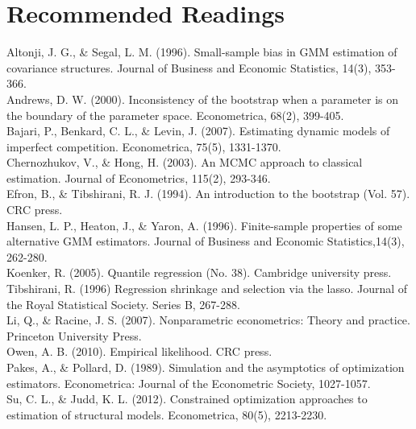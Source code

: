 \documentclass[11pt]{article}
\begin{document}
\section{Recommended Readings}
Altonji, J. G., \& Segal, L. M. (1996). Small-sample bias in GMM estimation of covariance structures. Journal of Business and Economic Statistics, 14(3), 353-366. \\
Andrews, D. W. (2000). Inconsistency of the bootstrap when a parameter is on the boundary of the parameter space. Econometrica, 68(2), 399-405. \\
Bajari, P., Benkard, C. L., \& Levin, J. (2007). Estimating dynamic models of imperfect competition. Econometrica, 75(5), 1331-1370. \\
Chernozhukov, V., \& Hong, H. (2003). An MCMC approach to classical estimation. Journal of Econometrics, 115(2), 293-346. \\
Efron, B., \& Tibshirani, R. J. (1994). An introduction to the bootstrap (Vol. 57). CRC press. \\
Hansen, L. P., Heaton, J., \& Yaron, A. (1996). Finite-sample properties of some alternative GMM estimators. Journal of Business and Economic Statistics,14(3), 262-280. \\
Koenker, R. (2005). Quantile regression (No. 38). Cambridge university press. \\
Tibshirani, R. (1996) Regression shrinkage and selection via the lasso. Journal of the Royal Statistical Society. Series B, 267-288. \\
Li, Q., \& Racine, J. S. (2007). Nonparametric econometrics: Theory and practice. Princeton University Press. \\
Owen, A. B. (2010). Empirical likelihood. CRC press. \\
Pakes, A., \& Pollard, D. (1989). Simulation and the asymptotics of optimization estimators. Econometrica: Journal of the Econometric Society, 1027-1057. \\
Su, C. L., \& Judd, K. L. (2012). Constrained optimization approaches to estimation of structural models. Econometrica, 80(5), 2213-2230.
\end{document}
